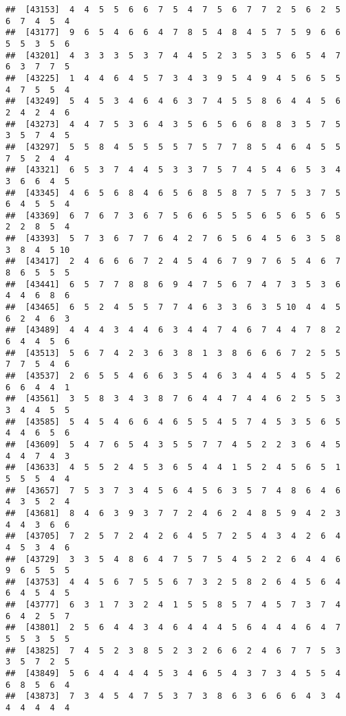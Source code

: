 \documentclass[
]{book}
\begin{document}
\begin{verbatim}
##  [43153]  4  4  5  5  6  6  7  5  4  7  5  6  7  7  2  5  6  2  5  6  7  4  5  4
##  [43177]  9  6  5  4  6  6  4  7  8  5  4  8  4  5  7  5  9  6  6  5  5  3  5  6
##  [43201]  4  3  3  3  5  3  7  4  4  5  2  3  5  3  5  6  5  4  7  6  3  7  7  5
##  [43225]  1  4  4  6  4  5  7  3  4  3  9  5  4  9  4  5  6  5  5  4  7  5  5  4
##  [43249]  5  4  5  3  4  6  4  6  3  7  4  5  5  8  6  4  4  5  6  2  4  2  4  6
##  [43273]  4  4  7  5  3  6  4  3  5  6  5  6  6  8  8  3  5  7  5  3  5  7  4  5
##  [43297]  5  5  8  4  5  5  5  5  7  5  7  7  8  5  4  6  4  5  5  7  5  2  4  4
##  [43321]  6  5  3  7  4  4  5  3  3  7  5  7  4  5  4  6  5  3  4  3  6  6  4  5
##  [43345]  4  6  5  6  8  4  6  5  6  8  5  8  7  5  7  5  3  7  5  6  4  5  5  4
##  [43369]  6  7  6  7  3  6  7  5  6  6  5  5  5  6  5  6  5  6  5  2  2  8  5  4
##  [43393]  5  7  3  6  7  7  6  4  2  7  6  5  6  4  5  6  3  5  8  3  8  4  5 10
##  [43417]  2  4  6  6  6  7  2  4  5  4  6  7  9  7  6  5  4  6  7  8  6  5  5  5
##  [43441]  6  5  7  7  8  8  6  9  4  7  5  6  7  4  7  3  5  3  6  4  4  6  8  6
##  [43465]  6  5  2  4  5  5  7  7  4  6  3  3  6  3  5 10  4  4  5  6  2  4  6  3
##  [43489]  4  4  4  3  4  4  6  3  4  4  7  4  6  7  4  4  7  8  2  6  4  4  5  6
##  [43513]  5  6  7  4  2  3  6  3  8  1  3  8  6  6  6  7  2  5  5  7  7  5  4  6
##  [43537]  2  6  5  5  4  6  6  3  5  4  6  3  4  4  5  4  5  5  2  6  6  4  4  1
##  [43561]  3  5  8  3  4  3  8  7  6  4  4  7  4  4  6  2  5  5  3  3  4  4  5  5
##  [43585]  5  4  5  4  6  6  4  6  5  5  4  5  7  4  5  3  5  6  5  4  4  6  5  6
##  [43609]  5  4  7  6  5  4  3  5  5  7  7  4  5  2  2  3  6  4  5  4  4  7  4  3
##  [43633]  4  5  5  2  4  5  3  6  5  4  4  1  5  2  4  5  6  5  1  5  5  5  4  4
##  [43657]  7  5  3  7  3  4  5  6  4  5  6  3  5  7  4  8  6  4  6  4  3  5  2  4
##  [43681]  8  4  6  3  9  3  7  7  2  4  6  2  4  8  5  9  4  2  3  4  4  3  6  6
##  [43705]  7  2  5  7  2  4  2  6  4  5  7  2  5  4  3  4  2  6  4  4  5  3  4  6
##  [43729]  3  3  5  4  8  6  4  7  5  7  5  4  5  2  2  6  4  4  6  9  6  5  5  5
##  [43753]  4  4  5  6  7  5  5  6  7  3  2  5  8  2  6  4  5  6  4  6  4  5  4  5
##  [43777]  6  3  1  7  3  2  4  1  5  5  8  5  7  4  5  7  3  7  4  6  4  2  5  7
##  [43801]  2  5  6  4  4  3  4  6  4  4  4  5  6  4  4  4  6  4  7  5  5  3  5  5
##  [43825]  7  4  5  2  3  8  5  2  3  2  6  6  2  4  6  7  7  5  3  3  5  7  2  5
##  [43849]  5  6  4  4  4  4  5  3  4  6  5  4  3  7  3  4  5  5  4  6  8  5  6  4
##  [43873]  7  3  4  5  4  7  5  3  7  3  8  6  3  6  6  6  4  3  4  4  4  4  4  4

\end{verbatim}
\end{document}
